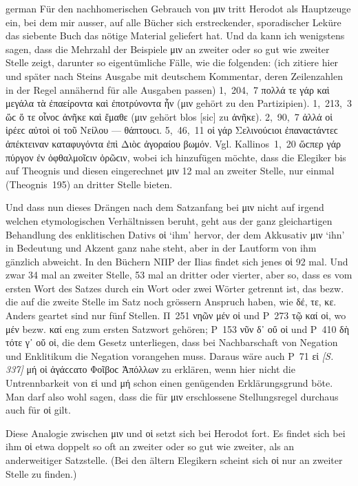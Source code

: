 \begin{otherlanguage*}{german}
Für den nachhomerischen Gebrauch von μιν tritt Herodot als Hauptzeuge ein, bei dem mir ausser, auf alle Bücher sich erstreckender, sporadischer Leküre das siebente Buch das nötige Material geliefert hat. Und da kann ich wenigstens sagen, dass die Mehrzahl der Beispiele μιν an zweiter oder so gut wie zweiter Stelle zeigt, darunter so eigentümliche Fälle, wie die folgenden: (ich zitiere hier und später nach Steins Ausgabe mit deutschem Kommentar, deren Zeilenzahlen in der Regel annähernd für alle Ausgaben passen) 1,~204,~7 πολλά τε γάρ  καὶ μεγάλα τὰ ἐπαείροντα καὶ ἐποτρύνοντα ἦν (μιν gehört zu den Partizipien). 1,~213,~3 ὥϲ  ὅ τε οἶνοϲ ἀνῆκε καὶ ἔμαθε (μιν gehört blos [sic] zu ἀνῆκε). 2,~90,~7 ἀλλά  οἱ ἱρέεϲ αὐτοὶ οἱ τοῦ Νείλου — θάπτουϲι. 5,~46,~11 οἱ γάρ  Σελινούϲιοι ἐπαναϲτάντεϲ ἀπέκτειναν καταφυγόντα ἐπὶ Διὸϲ ἀγοραίου βωμόν. Vgl. Kallinos~1,~20 ὥϲπερ γάρ  πύργον ἐν ὀφθαλμοῖϲιν ὁρῶϲιν, wobei ich hinzufügen möchte, dass die Elegiker bis auf Theognis und diesen eingerechnet μιν 12 mal an zweiter Stelle, nur einmal (Theognis~195) an dritter Stelle bieten.

Und dass nun dieses Drängen nach dem Satzanfang bei μιν nicht auf irgend welchen etymologischen Verhältnissen beruht, geht aus der ganz gleichartigen Behandlung des enklitischen Dativs οἱ ‘ihm’ hervor, der dem Akkusativ μιν ‘ihn’ in Bedeutung und Akzent ganz nahe steht, aber in der Lautform von ihm gänzlich abweicht. In den Büchern ΝΠΡ der Ilias findet sich jenes οἱ 92 mal. Und zwar 34 mal an zweiter Stelle, 53 mal an dritter oder vierter, aber so, dass es vom ersten Wort des Satzes durch ein Wort oder zwei Wörter getrennt ist, das bezw. die auf die zweite Stelle im Satz noch grössern Anspruch haben, wie δέ, τε, κε. Anders geartet sind nur fünf Stellen. Π~251 νηῶν μέν οἱ und Ρ~273 τῷ καί οἱ, wo μέν bezw. καί eng zum ersten Satzwort gehören; Ρ~153 νῦν δ᾽ οὔ οἱ und Ρ~410 δὴ τότε γ᾽ οὔ οἱ, die dem Gesetz unterliegen, dass bei Nachbarschaft von Negation und Enklitikum die Negation vorangehen muss. Daraus wäre auch Ρ~71 εἰ \hypertarget{p337}{\emph{[S. 337]}}\label{p337} μή οἱ ἀγάϲϲατο Φοῖβοϲ Ἀπόλλων zu erklären, wenn hier nicht die Untrennbarkeit von εἰ und μή schon einen genügenden Erklärungsgrund böte. Man darf also wohl sagen, dass die für μιν erschlossene Stellungsregel durchaus auch für οἱ gilt.

Diese Analogie zwischen μιν und οἱ setzt sich bei Herodot fort. Es findet sich bei ihm οἱ etwa doppelt so oft an zweiter oder so gut wie zweiter, als an anderweitiger Satzstelle. (Bei den ältern Elegikern scheint sich οἱ nur an zweiter Stelle zu finden.)


\end{otherlanguage*}
